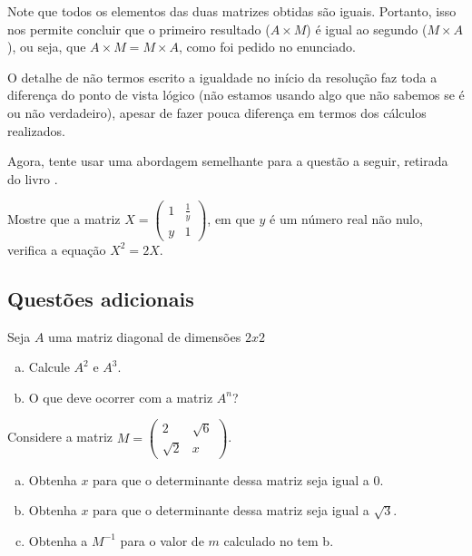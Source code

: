\documentclass[main_estudante.tex]{subfiles}
\begin{document}
Note que todos os elementos das duas matrizes obtidas são iguais. Portanto, isso nos permite concluir que o primeiro resultado ($A \times M$) é igual ao segundo ($M \times A$), ou seja, que $A \times M = M \times A$, como foi pedido no enunciado.

O detalhe de não termos escrito a igualdade no início da resolução faz toda a diferença do ponto de vista lógico (não estamos usando algo que não sabemos se é ou não verdadeiro), apesar de fazer pouca diferença em termos dos cálculos realizados.

Agora, tente usar uma abordagem semelhante para a questão a seguir, retirada do livro .

\begin{resolva}
Mostre que a matriz $X = \begin{pmatrix}1 & \frac{1}{y} \\ y & 1\end{pmatrix}$, em que $y$ é um número real não nulo, verifica a equação $X^2 = 2X$.
\end{resolva}

\paraTutores

\subsection{Questões adicionais}

\begin{adicional}
Seja $A$ uma matriz diagonal de dimensões $2x2$
\begin{enumerate}[a)]
\item Calcule $A^2$ e $A^3$.
\item O que deve ocorrer com a matriz $A^n$?
\end{enumerate}
\end{adicional}


\begin{adicional}
Considere a matriz $M=\begin{pmatrix}2 & \sqrt{6} \\ \sqrt{2} & x\end{pmatrix}$.
\begin{enumerate}[a)]
\item Obtenha $x$ para que o determinante dessa matriz seja igual a $0$.
\item Obtenha $x$ para que o determinante dessa matriz seja igual a $\sqrt{3}$.
\item Obtenha a $M^{-1}$ para o valor de $m$ calculado no tem b.
\end{enumerate}
\end{adicional}
\end{document}

